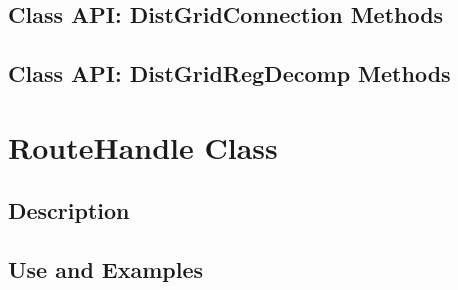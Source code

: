 \documentclass[english]{article}
\begin{document}
\subsection{Class API: DistGridConnection Methods}
\label{ref:distgridconnection}

\subsection{Class API: DistGridRegDecomp Methods}
\label{ref:distgridregdecomp}

%
%
%
\section{RouteHandle Class}
\subsection{Description}

%
\subsection{Use and Examples}






\end{document}
